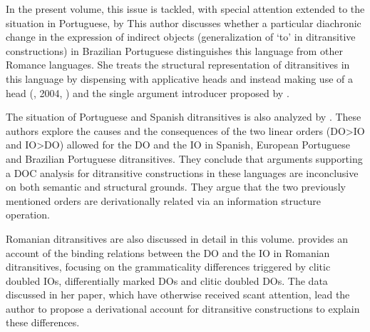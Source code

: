 \begin{styleListNumberi}
In the present volume, this issue is tackled, with special attention extended to the situation in Portuguese, by This author discusses whether a particular diachronic change in the expression of indirect objects (generalization of ‘to’ in ditransitive constructions) in Brazilian Portuguese distinguishes this language from other Romance languages. She treats the structural representation of ditransitives in this language by dispensing with applicative heads and instead making use of a  head (\citealt{Svenonius2003}, 2004, \citealt{Wood2012}) and the  single argument introducer proposed by \citet{WoodMarantz2017}. 
\end{styleListNumberi}

\begin{styleListNumberi}
The situation of Portuguese and Spanish ditransitives is also analyzed by . These authors explore the causes and the consequences of the two linear orders (DO>IO and IO>DO) allowed for the DO and the IO in Spanish, European Portuguese and Brazilian Portuguese ditransitives. They conclude that arguments supporting a DOC analysis for ditransitive constructions in these languages are inconclusive on both semantic and structural grounds. They argue that the two previously mentioned orders are derivationally related via an information structure operation.
\end{styleListNumberi}

\begin{styleListNumberi}
Romanian ditransitives are also discussed in detail in this volume. provides an account of the binding relations between the DO and the IO in Romanian ditransitives, focusing on the grammaticality differences triggered by clitic doubled IOs, differentially marked DOs and clitic doubled DOs. The data discussed in her paper, which have otherwise received scant attention, lead the author to propose a derivational account for ditransitive constructions to explain these differences.
\end{styleListNumberi}

